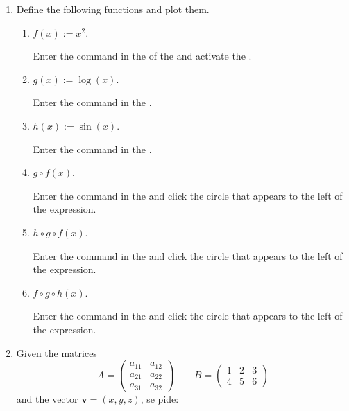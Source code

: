 \begin{enumerate}
\item Define the following functions and plot them.
      \begin{enumerate}
      \item $f(x):=x^2$.
            \begin{indication}
            Enter the command  in the  of the  and activate the .
            \end{indication}
      \item $g(x):=\log(x)$.
            \begin{indication}
            Enter the command  in the .
            \end{indication}
      \item $h(x):=\sin(x)$.
            \begin{indication}
            Enter the command  in the .
            \end{indication}
      \item $g\circ f(x)$.
            \begin{indication}
            Enter the command  in the  and click the circle that appears to the left of the expression.
            \end{indication}
      \item $h\circ g \circ f(x)$.
            \begin{indication}
            Enter the command  in the  and click the circle that appears to the left of the expression.
            \end{indication}
      \item $f\circ g \circ h(x)$.
            \begin{indication}
            Enter the command  in the  and click the circle that appears to the left of the expression.
            \end{indication}
      \end{enumerate}

\item Given the matrices
      \[
      A=\left(
      \begin{array}{cc}
      a_{11} & a_{12} \\
      a_{21} & a_{22} \\
      a_{31} & a_{32}
      \end{array}
      \right)
      \qquad
      B=\left(
      \begin{array}{ccc}
      1 & 2 & 3 \\
      4 & 5 & 6
      \end{array}
      \right)
      \]
      and the vector $\mathbf{v}=(x, y, z)$, se pide:


\end{enumerate}
